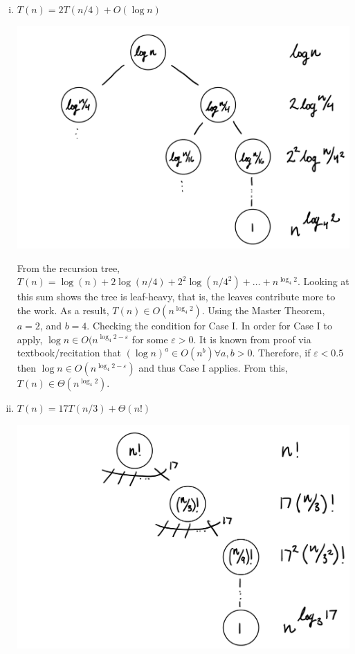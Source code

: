 \documentclass[12pt,twoside]{article}
\begin{document}
\begin{problems}
\begin{problemparts}
\problempart %
\begin{enumerate}[i.]
  \item $ T(n) = 2 T(n/4) + O(\log n) $
    \begin{center}
        \includegraphics[scale=0.4]{Images/i.PNG}
    \end{center}
    From the recursion tree, $ T(n) = \log(n) + 2 \log (n/4) + 2^2 \log (n/4^2)
        + \ldots + n^{\log_4 2}$.  Looking at this sum shows the tree is
        leaf-heavy, that is, the leaves contribute more to the work. As a
        result, $ T(n) \in O(n^{\log_4 2}) $.
    \smallbreak
    Using the Master Theorem, $ a = 2 $, and $ b = 4 $. Checking the condition
        for Case I. In order for Case I to apply, $ \log n \in O(n^{\log_4 2 -
        \varepsilon} $ for some $ \varepsilon > 0 $. It is known from proof via
        textbook/recitation that $ (\log n)^a \in O(n^b) \forall a,b > 0 $.
        Therefore, if $ \varepsilon < 0.5 $ then $ \log n \in O(n^{\log_4 2 -
        \varepsilon}) $ and thus Case I applies. From this, $ T(n) \in
        \Theta(n^{\log_4 2}) $.
  \item $ T(n) = 17 T(n/3) + \Theta(n!) $
    \begin{center}
        \includegraphics[scale=0.4]{Images/ii.PNG}

\end{center}
\end{enumerate}
\end{problemparts}
\end{problems}
\end{document}
